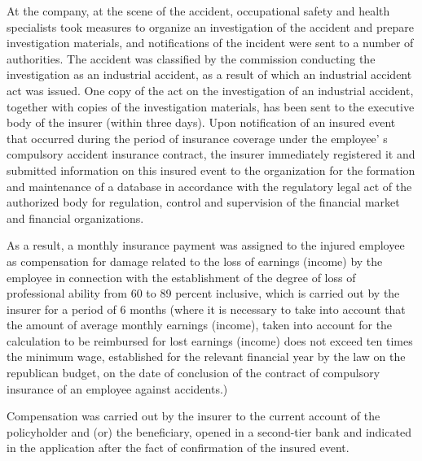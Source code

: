 \begin{multicols}{2}
At the company, at the scene of the accident, occupational safety and
health specialists took measures to organize an investigation of the
accident and prepare investigation materials, and notifications of the
incident were sent to a number of authorities. The accident was
classified by the commission conducting the investigation as an
industrial accident, as a result of which an industrial accident act was
issued. One copy of the act on the investigation of an industrial
accident, together with copies of the investigation materials, has been
sent to the executive body of the insurer (within three days). Upon
notification of an insured event that occurred during the period of
insurance coverage under the employee' s compulsory
accident insurance contract, the insurer immediately registered it and
submitted information on this insured event to the organization for the
formation and maintenance of a database in accordance with the
regulatory legal act of the authorized body for regulation, control and
supervision of the financial market and financial organizations.

As a result, a monthly insurance payment was assigned to the injured
employee as compensation for damage related to the loss of earnings
(income) by the employee in connection with the establishment of the
degree of loss of professional ability from 60 to 89 percent inclusive,
which is carried out by the insurer for a period of 6 months (where it
is necessary to take into account that the amount of average monthly
earnings (income), taken into account for the calculation to be
reimbursed for lost earnings (income) does not exceed ten times the
minimum wage, established for the relevant financial year by the law on
the republican budget, on the date of conclusion of the contract of
compulsory insurance of an employee against accidents.)

Compensation was carried out by the insurer to the current account of
the policyholder and (or) the beneficiary, opened in a second-tier bank
and indicated in the application after the fact of confirmation of the
insured event.
\end{multicols}

